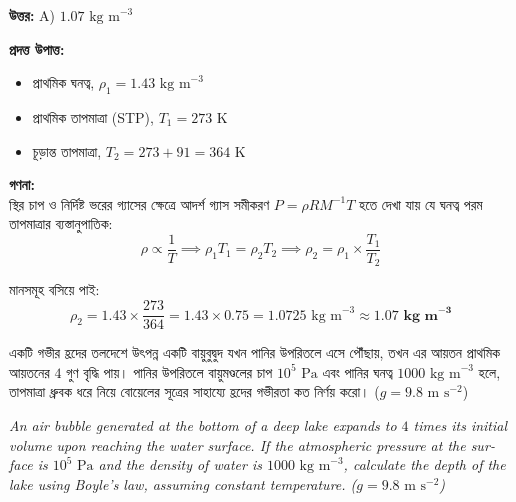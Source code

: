 \documentclass[12pt, a4paper]{article}
\begin{document}
\vspace{0.5em}
\begin{tcolorbox}[answerbox]
    \textbf{\color{success} উত্তর:} A) $1.07\text{ kg m}^{-3}$
\end{tcolorbox}
\vspace{1em}

\begin{tcolorbox}[solutionbox={সমাধান (Solution)}]
    \noindent
    \textbf{প্রদত্ত উপাত্ত:}
    \begin{itemize}[leftmargin=1.5em, itemsep=0.2em]
        \item প্রাথমিক ঘনত্ব, $\rho_1 = 1.43\text{ kg m}^{-3}$
        \item প্রাথমিক তাপমাত্রা (STP), $T_1 = 273\text{ K}$
        \item চূড়ান্ত তাপমাত্রা, $T_2 = 273 + 91 = 364\text{ K}$
    \end{itemize}

    \vspace{0.6em}
    \noindent\textbf{গণনা:} \\
    স্থির চাপ ও নির্দিষ্ট ভরের গ্যাসের ক্ষেত্রে আদর্শ গ্যাস সমীকরণ $P = \rho R M^{-1} T$ হতে দেখা যায় যে ঘনত্ব পরম তাপমাত্রার ব্যস্তানুপাতিক:
    \[ \rho \propto \frac{1}{T} \implies \rho_1 T_1 = \rho_2 T_2 \implies \rho_2 = \rho_1 \times \frac{T_1}{T_2} \]
    
    মানসমূহ বসিয়ে পাই:
    \[ \rho_2 = 1.43 \times \frac{273}{364} = 1.43 \times 0.75 = 1.0725\text{ kg m}^{-3} \approx \mathbf{1.07\text{ kg m}^{-3}} \]
\end{tcolorbox}


\begin{tcolorbox}[questionbox={প্রশ্ন (Question) 20}]
    \noindent
    একটি গভীর হ্রদের তলদেশে উৎপন্ন একটি বায়ুবুদ্বুদ যখন পানির উপরিতলে এসে পৌঁছায়, তখন এর আয়তন প্রাথমিক আয়তনের $4$ গুণ বৃদ্ধি পায়। পানির উপরিতলে বায়ুমণ্ডলের চাপ $10^5\text{ Pa}$ এবং পানির ঘনত্ব $1000\text{ kg m}^{-3}$ হলে, তাপমাত্রা ধ্রুবক ধরে নিয়ে বোয়েলের সূত্রের সাহায্যে হ্রদের গভীরতা কত নির্ণয় করো। ($g = 9.8\text{ m s}^{-2}$)
    
    \vspace{0.8em}
    \begin{english}
    \noindent\textit{\color{darkgray}
    An air bubble generated at the bottom of a deep lake expands to $4$ times its initial volume upon reaching the water surface. If the atmospheric pressure at the surface is $10^5\text{ Pa}$ and the density of water is $1000\text{ kg m}^{-3}$, calculate the depth of the lake using Boyle's law, assuming constant temperature. ($g = 9.8\text{ m s}^{-2}$)
    }
    \end{english}
\end{tcolorbox}
\end{document}
